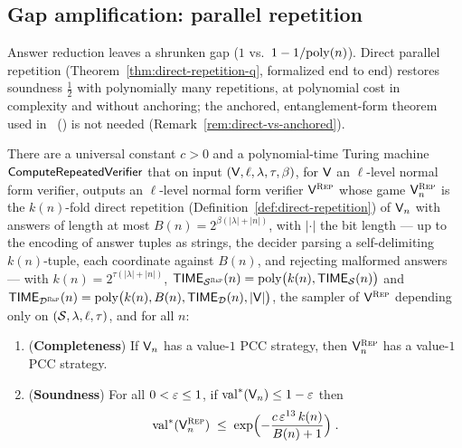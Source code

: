 \subsection{Gap amplification: parallel repetition}
\label{sec:ps-parallel-repetition}

Answer reduction leaves a shrunken gap ($1$ vs.\ $1 - 1/\mathrm{poly}(n)$). Direct parallel
repetition (Theorem~\ref{thm:direct-repetition-q}, formalized end to end) restores
soundness
$\frac12$ with polynomially many repetitions, at polynomial cost in complexity and without
anchoring; the anchored, entanglement-form theorem used in~\cite{JNVWY20}
(\cite{BVY17}) is not needed (Remark~\ref{rem:direct-vs-anchored}).

\begin{theorem}
\label{thm:parallel-repetition}
\leanok
There are a universal constant $c > 0$ and a polynomial-time Turing machine
$\mathsf{ComputeRepeatedVerifier}$ that on input $(\mathsf{V}, \ell, \lambda, \tau, \beta)$, for
$\mathsf{V}$ an $\ell$-level normal form verifier, outputs an $\ell$-level normal form
verifier $\mathsf{V}^{\textsc{Rep}}$ whose game $\mathsf{V}^{\textsc{Rep}}_n$ is the $k(n)$-fold direct repetition
(Definition~\ref{def:direct-repetition}) of $\mathsf{V}_n$ with answers of length at most
$B(n) = 2^{\beta(|\lambda| + |n|)}$, with $|\cdot|$ the bit length --- up to the encoding of
answer tuples as strings, the decider parsing a self-delimiting $k(n)$-tuple, each coordinate
against $B(n)$, and rejecting malformed answers --- with $k(n) = 2^{\tau(|\lambda| + |n|)}$,
$\mathsf{TIME}_{\mathcal{S}^{\textsc{Rep}}}(n) = \mathrm{poly}\bigl(k(n),
\mathsf{TIME}_{\mathcal{S}}(n)\bigr)$ and $\mathsf{TIME}_{\mathcal{D}^{\textsc{Rep}}}(n) = \mathrm{poly}\bigl(k(n), B(n), \mathsf{TIME}_{\mathcal{D}}(n),
\left\vert {\mathsf{V}} \right\vert\bigr)$, the sampler of $\mathsf{V}^{\textsc{Rep}}$ depending only on $(\mathcal{S}, \lambda, \ell,
\tau)$, and for all $n$:
\begin{enumerate}
\item (\textbf{Completeness}) If $\mathsf{V}_n$ has a value-$1$ PCC strategy, then $\mathsf{V}^{\textsc{Rep}}_n$
  has a value-$1$ PCC strategy.
\item (\textbf{Soundness}) For all $0 < \varepsilon \leq 1$, if $\mathrm{val}^*(\mathsf{V}_n) \leq 1 -
  \varepsilon$ then
  \begin{equation*}
    \mathrm{val}^*(\mathsf{V}^{\textsc{Rep}}_n) \;\leq\; \exp\Bigl( - \frac{c\, \varepsilon^{13}\, k(n)}{B(n) + 1} \Bigr)\;.
  \end{equation*}
\end{enumerate}
\end{theorem}
